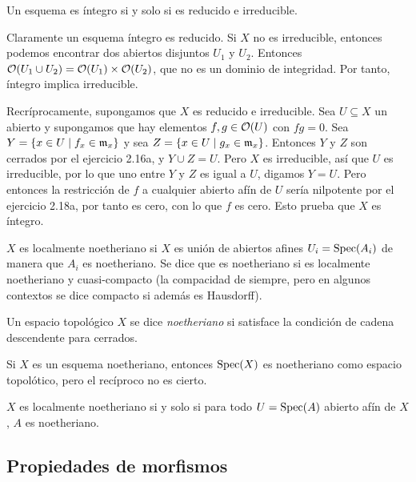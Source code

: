 \documentclass[GA.tex]{subfiles}
\begin{document}
\begin{prop}
Un esquema es íntegro si y solo si es reducido e irreducible.
\end{prop}
\begin{dem}
Claramente un esquema íntegro es reducido. Si $X$ no es irreducible, entonces podemos encontrar dos abiertos disjuntos $U_1$ y $U_2$. Entonces ${\mathcal O}(U_1\cup U_2)={\mathcal O}(U_1)\times{\mathcal O}(U_2)$, que no es un dominio de integridad. Por tanto, íntegro implica irreducible.

Recríprocamente, supongamos que $X$ es reducido e irreducible. Sea $U\subseteq X$ un abierto y supongamos que hay elementos $f,g\in{\mathcal O}(U)$ con $fg=0$. Sea $Y=\{x\in U\mid f_x\in{\mathfrak{m}}_x\}$ y sea $Z=\{x\in U\mid g_x\in{\mathfrak{m}}_x\}$. Entonces $Y$ y $Z$ son cerrados por el ejercicio 2.16a, y $Y\cup Z=U$. Pero $X$ es irreducible, así que $U$ es irreducible, por lo que uno entre $Y$ y $Z$ es igual a $U$, digamos $Y=U$. Pero entonces la restricción de $f$ a cualquier abierto afín de $U$ sería nilpotente por el ejercicio 2.18a, por tanto es cero, con lo que $f$ es cero. Esto prueba que $X$ es íntegro. 
\end{dem}

\begin{defi}
$X$ es localmente noetheriano si $X$ es unión de abiertos afines $U_i=\operatorname{Spec}(A_i)$ de manera que $A_i$ es noetheriano. Se dice que es noetheriano si es localmente noetheriano y cuasi-compacto (la compacidad de siempre, pero en algunos contextos se dice compacto si además es Hausdorff). 
\end{defi}

\begin{defi}
Un espacio topológico $X$ se dice \emph{noetheriano} si satisface la condición de cadena descendente para cerrados. 
\end{defi}

\begin{nota}
Si $X$ es un esquema noetheriano, entonces $\operatorname{Spec}(X)$ es noetheriano como espacio topolótico, pero el recíproco no es cierto.
\end{nota}

\begin{prop}
$X$ es localmente noetheriano si y solo si para todo $U=\operatorname{Spec}(A)$ abierto afín de $X$, $A$ es noetheriano. 
\end{prop}


\subsection{Propiedades de morfismos}
\end{document}
